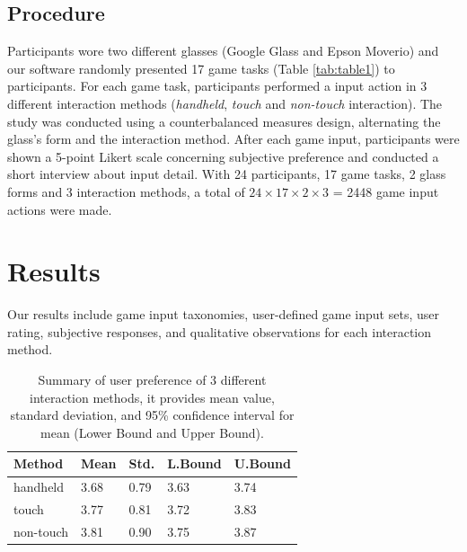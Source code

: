 \documentclass{sigchi}
\newcommand\tabhead[1]{\small\textbf{#1}}
\begin{document}
  

    \subsection {Procedure}
    Participants wore two different glasses (Google Glass and Epson Moverio) and our software randomly presented 17 game tasks (Table \ref{tab:table1}) to participants. For each game task, participants performed a input action in 3 different interaction methods (\emph{handheld}, \emph{touch} and \emph{non-touch} interaction). The study was conducted using a counterbalanced measures design, alternating the glass's form and the interaction method. After each game input, participants were shown a 5-point Likert scale concerning subjective preference and conducted a short interview about input detail. With 24 participants, 17 game tasks, 2 glass forms and 3 interaction methods, a total of $24 \times 17 \times 2 \times 3$ = 2448 game input actions were made. 


\section{Results}

Our results include game input taxonomies, user-defined game input sets, user rating, subjective responses, and qualitative observations for each interaction method.

  \begin{table}
    \centering
    \begin{tabular}{|l|l|l|l|l|}
      \hline
      \tabhead{Method} &
      \multicolumn{1}{|p{0.13\columnwidth}|}{\centering\tabhead{Mean}} &
      \multicolumn{1}{|p{0.13\columnwidth}|}{\centering\tabhead{Std.}} &
      \multicolumn{1}{|p{0.13\columnwidth}|}{\centering\tabhead{L.Bound}} &
      \multicolumn{1}{|p{0.13\columnwidth}|}{\centering\tabhead{U.Bound}} \\
      \hline
      handheld & 3.68 & 0.79 & 3.63 & 3.74\\
      \hline
      touch & 3.77 & 0.81 & 3.72 & 3.83\\
      \hline
      non-touch & 3.81 & 0.90 & 3.75 & 3.87\\
      \hline

    

    \end{tabular}
    \caption{Summary of user preference of 3 different interaction methods, it provides mean value, standard deviation, and 95\% confidence interval for mean (Lower Bound and Upper Bound).}
    \label{tab:tablePreferenceInteractionMethod}
  \end{table}
\end{document}
